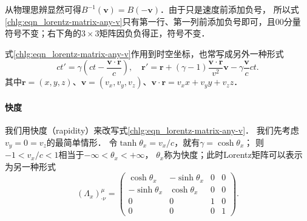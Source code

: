 从物理思辨显然可得$B^{-1}(\boldsymbol{v})=B(\boldsymbol{-v})$．由于只是速度前添加负号，
所以式\eqref{chlg:eqn_lorentz-matrix-any-v}只有第一行、第一列前添加负号即可，且$00$分量
符号不变；右下角的$3\times 3$矩阵因负负得正，符号不变．

式\eqref{chlg:eqn_lorentz-matrix-any-v}作用到时空坐标，也常写成另外一种形式
\begin{equation}\label{chlg:eqn_boost-xt}
    ct'= \gamma\left( ct-\frac{\boldsymbol{v}\cdot\boldsymbol{r}}{c}\right) , \quad
    \boldsymbol{r}' = \boldsymbol{r}+(\gamma-1)\frac{\boldsymbol{v}
        \cdot\boldsymbol{r}}{v^2}\boldsymbol{v}-\gamma \frac{\boldsymbol{v}}{c} ct.
\end{equation}
其中$\boldsymbol{r}=(x,y,z)$、$\boldsymbol{v}=(v_x, v_y, v_z )$、$\boldsymbol{v}\cdot \boldsymbol{r}=v_x x+v_y y+v_z z$．

\paragraph{快度}\label{chlg:sec_rapid}
我们用{\kaishu 快度}（rapidity）来改写式\eqref{chlg:eqn_lorentz-matrix-any-v}．
我们先考虑$v_y=0=v_z$的最简单情形．
令$\tanh \theta_x=v_x/c$，就有$\gamma = \cosh \theta_x$；
则$-1<v_x/c<1$相当于$-\infty < \theta_x <+\infty$，
$\theta_x$称为{\heiti 快度}；此时Lorentz矩阵可以表示为另一种形式
\begin{equation}\label{chlg:eqn_lorentz-rapid-x}
    (\Lambda_x)^{\mu}_{\cdot \nu} = 
    \begin{pmatrix}
        \cosh\theta_x  & -\sinh\theta_x & 0 & 0 \\
        -\sinh\theta_x & \cosh\theta_x  & 0 & 0 \\
        0 & 0 & 1 & 0 \\
        0 & 0 & 0 & 1 
    \end{pmatrix}.
\end{equation}

